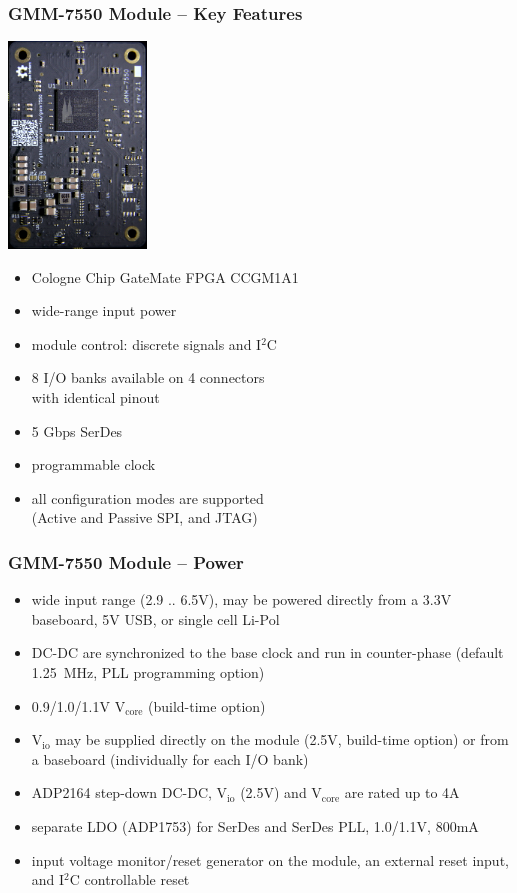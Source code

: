 \begin{frame}
  \frametitle{GMM-7550 Module -- Key Features}

  \begin{flushright}
    \includegraphics[height=5.5cm]{gmm7550.jpg}
  \end{flushright}
  \vspace{-5.5cm}

  \begin{minipage}{9cm}
  \begin{itemize}
  \item Cologne Chip GateMate FPGA CCGM1A1
  \item wide-range input power
  \item module control: discrete signals and I$^2$C
  \item 8 I/O banks available on 4 connectors\\with identical pinout
  \item 5 Gbps SerDes
  \item programmable clock
  \item all configuration modes are supported\\(Active and Passive SPI,
  and JTAG)
  \end{itemize}
  \end{minipage}
\end{frame}

\begin{frame}
  \frametitle{GMM-7550 Module -- Power}
  \begin{itemize}
  \item wide input range (2.9 .. 6.5V), may be powered directly from a
  3.3V baseboard, 5V USB, or single cell Li-Pol
  \item DC-DC are synchronized to the base clock and run in
  counter-phase (default 1.25~MHz, PLL programming option)
  \item 0.9/1.0/1.1V V$_{\text{core}}$ (build-time option)
  \item V$_{\text{io}}$ may be supplied directly on the module (2.5V, build-time
  option) or from\\a baseboard (individually for each I/O bank)
  \item ADP2164 step-down DC-DC, V$_{\text{io}}$ (2.5V) and V$_{\text{core}}$ are rated up to 4A
  \item separate LDO (ADP1753) for SerDes and SerDes PLL, 1.0/1.1V, 800mA
  \item input voltage monitor/reset generator on the module, an
  external reset input, and I$^2$C controllable reset
  \end{itemize}
\end{frame}


